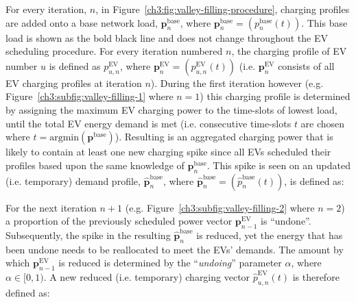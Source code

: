 
For every iteration, $n$, in Figure~\ref{ch3:fig:valley-filling-procedure}, charging profiles are added onto a base network load, $\textbf{p}^\text{base}_{n}$, where $\textbf{p}^\text{base}_{n} = (p^\text{base}_{n}(t))$.
This base load is shown as the bold black line and does not change throughout the EV scheduling procedure.
For every iteration numbered $n$, the charging profile of EV number $u$ is defined as $p^\text{EV}_{u,n}$, where $\textbf{p}^\text{EV}_n = (p^\text{EV}_{u,n}(t))$ (i.e. $\textbf{p}^\text{EV}_n$ consists of all EV charging profiles at iteration $n$).
During the first iteration however (e.g. Figure~\ref{ch3:subfig:valley-filling-1} where $n=1$) this charging profile is determined by assigning the maximum EV charging power to the time-slots of lowest load, until the total EV energy demand is met (i.e. consecutive time-slots $t$ are chosen where $t = \text{argmin}(\textbf{p}^\text{base})$).
Resulting is an aggregated charging power that is likely to contain at least one new charging spike since all EVs scheduled their profiles based upon the same knowledge of $\textbf{p}^\text{base}_{n}$.
This spike is seen on an updated (i.e. temporary) demand profile, $\hat{\textbf{p}}^\text{base}_{n}$, where $\hat{\textbf{p}}^\text{base}_{n} = (\hat{p}^\text{base}_{n}(t))$, is defined as:




For the next iteration $n+1$ (e.g. Figure~\ref{ch3:subfig:valley-filling-2} where $n=2$) a proportion of the previously scheduled power vector $\textbf{p}^\text{EV}_{n-1}$ is ``undone''.
Subsequently, the spike in the resulting $\hat{\textbf{p}}^\text{base}_{n}$ is reduced, yet the energy that has been undone needs to be reallocated to meet the EVs' demands.
The amount by which $\textbf{p}^\text{EV}_{n-1}$ is reduced is determined by the ``\textit{undoing}'' parameter $\alpha$, where $\alpha \in [0, 1)$.
A new reduced (i.e. temporary) charging vector $\hat{p}^\text{EV}_{u, n}(t)$ is therefore defined as:

